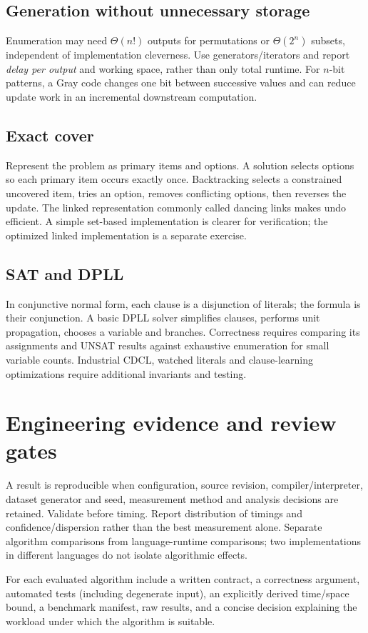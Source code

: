 \documentclass[11pt,letterpaper]{article}
\begin{document}
\subsection{Generation without unnecessary storage}
Enumeration may need $\Theta(n!)$ outputs for permutations or $\Theta(2^n)$ subsets, independent of implementation cleverness. Use generators/iterators and report \emph{delay per output} and working space, rather than only total runtime. For $n$-bit patterns, a Gray code changes one bit between successive values and can reduce update work in an incremental downstream computation.
\subsection{Exact cover}
Represent the problem as primary items and options. A solution selects options so each primary item occurs exactly once. Backtracking selects a constrained uncovered item, tries an option, removes conflicting options, then reverses the update. The linked representation commonly called dancing links makes undo efficient. A simple set-based implementation is clearer for verification; the optimized linked implementation is a separate exercise.
\subsection{SAT and DPLL}
In conjunctive normal form, each clause is a disjunction of literals; the formula is their conjunction. A basic DPLL solver simplifies clauses, performs unit propagation, chooses a variable and branches. Correctness requires comparing its assignments and UNSAT results against exhaustive enumeration for small variable counts. Industrial CDCL, watched literals and clause-learning optimizations require additional invariants and testing.
\section{Engineering evidence and review gates}
A result is reproducible when configuration, source revision, compiler/interpreter, dataset generator and seed, measurement method and analysis decisions are retained. Validate before timing. Report distribution of timings and confidence/dispersion rather than the best measurement alone. Separate algorithm comparisons from language-runtime comparisons; two implementations in different languages do not isolate algorithmic effects.
\begin{evidencebox}
For each evaluated algorithm include a written contract, a correctness argument, automated tests (including degenerate input), an explicitly derived time/space bound, a benchmark manifest, raw results, and a concise decision explaining the workload under which the algorithm is suitable.
\end{evidencebox}
\end{document}
